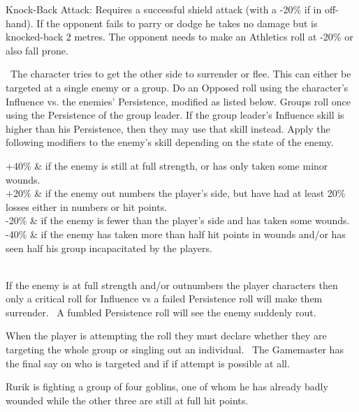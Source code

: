 \begin{description}
\begin{rpg-list}
\item Knock-Back Attack: Requires a successful shield attack (with a -20\% if in off-hand). If the opponent fails to parry or dodge he takes no damage but is knocked-back 2 metres. The opponent needs to make an Athletics roll at -20\% or also fall prone.
		\end{rpg-list}
	\item[Intimidate/Persuade:]  The character tries to get the other side to surrender or flee. This can either be targeted at a single enemy or a group.  Do an Opposed roll using the character’s Influence vs. the enemies’ Persistence, modified as listed below. Groups roll once using the Persistence of the group leader. If the group leader’s Influence skill is higher than his Persistence, then they may use that skill instead. Apply the following modifiers to the enemy’s skill depending on the state of the enemy.
	\begin{rpg-table}[|c|X|]
		\hline
		+40\% & if the enemy is still at full strength, or has only taken some minor wounds.\\
		+20\% & if the enemy out numbers the player’s side, but have had at least 20\% losses either in numbers or hit points.\\
		-20\% & if the enemy is fewer than the player’s side and has taken some wounds.\\
		-40\% & if the enemy has taken more than half hit points in wounds and/or has seen half his group incapacitated by the players.\\
		\hline
		\\
		\hline
	\end{rpg-table}

If the enemy is at full strength and/or outnumbers the player characters then only a critical roll for Influence vs a failed Persistence roll will make them surrender.  A fumbled Persistence roll will see the enemy suddenly rout.

When the player is attempting the roll they must declare whether they are targeting the whole group or singling out an individual.  The Gamemaster has the final say on who is targeted and if if attempt is possible at all. 

	\begin{rpg-examplebox}
Rurik is fighting a group of four goblins, one of whom he has already badly wounded while the other three are still at full hit points. 


\end{rpg-examplebox}
\end{description}
